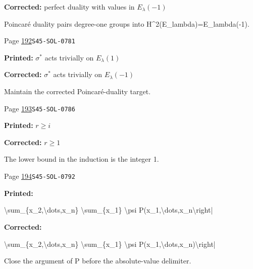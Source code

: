 \begin{description}
\par\noindent\textbf{Corrected:} perfect duality with values in $E_\lambda(-1)$
\par\noindent Poincaré duality pairs degree-one groups into H\textasciicircum{}2(E\_lambda)=E\_lambda(-1).
\smallskip
\item[\hypertarget{apparatus:EN-0121}{121}] Page \hyperlink{printpage:en:192}{192}\quad\texttt{S45-SOL-0781}
\par\noindent\textbf{Printed:} $\sigma^\ast$ acts trivially on $E_\lambda(1)$
\par\noindent\textbf{Corrected:} $\sigma^\ast$ acts trivially on $E_\lambda(-1)$
\par\noindent Maintain the corrected Poincaré-duality target.
\smallskip
\item[\hypertarget{apparatus:EN-0122}{122}] Page \hyperlink{printpage:en:193}{193}\quad\texttt{S45-SOL-0786}
\par\noindent\textbf{Printed:} $r\geqslant i$
\par\noindent\textbf{Corrected:} $r\geqslant 1$
\par\noindent The lower bound in the induction is the integer 1.
\smallskip
\item[\hypertarget{apparatus:EN-0123}{123}] Page \hyperlink{printpage:en:194}{194}\quad\texttt{S45-SOL-0792}
\par\noindent\textbf{Printed:} {\footnotesize\ttfamily\raggedright \textbackslash{}\allowbreak{}sum\_\allowbreak{}\{\allowbreak{}x\_\allowbreak{}2,\allowbreak{}\textbackslash{}\allowbreak{}dots,\allowbreak{}x\_\allowbreak{}n\}\allowbreak{} \textbackslash{}\allowbreak{}sum\_\allowbreak{}\{\allowbreak{}x\_\allowbreak{}1\}\allowbreak{} \textbackslash{}\allowbreak{}psi P(\allowbreak{}x\_\allowbreak{}1,\allowbreak{}\textbackslash{}\allowbreak{}dots,\allowbreak{}x\_\allowbreak{}n\textbackslash{}\allowbreak{}right|}
\par\noindent\textbf{Corrected:} {\footnotesize\ttfamily\raggedright \textbackslash{}\allowbreak{}sum\_\allowbreak{}\{\allowbreak{}x\_\allowbreak{}2,\allowbreak{}\textbackslash{}\allowbreak{}dots,\allowbreak{}x\_\allowbreak{}n\}\allowbreak{} \textbackslash{}\allowbreak{}sum\_\allowbreak{}\{\allowbreak{}x\_\allowbreak{}1\}\allowbreak{} \textbackslash{}\allowbreak{}psi P(\allowbreak{}x\_\allowbreak{}1,\allowbreak{}\textbackslash{}\allowbreak{}dots,\allowbreak{}x\_\allowbreak{}n)\allowbreak{}\textbackslash{}\allowbreak{}right|}
\par\noindent Close the argument of P before the absolute-value delimiter.

\end{description}
